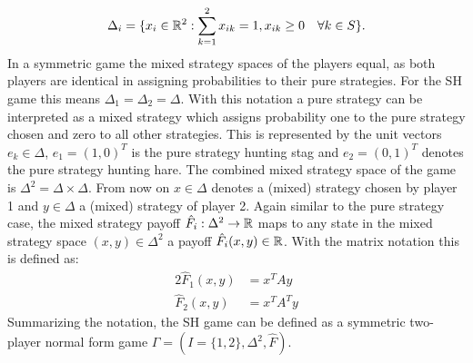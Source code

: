 \begin{align*}
        \Delta_i = \{ x_i \in \mathbb{R}^2 : \sum_{k=1}^2 x_{ik} = 1, x_{ik} \geq 0 \quad
\forall k \in S\}.
\end{align*}
In a symmetric game the mixed strategy spaces of the players
equal, as both players are identical in assigning probabilities to their
pure strategies. For the SH game this means $\Delta_1 = \Delta_2 = \Delta$.
With this notation a pure strategy can be interpreted as a mixed strategy
which assigns probability one to the pure strategy chosen and zero to all
other strategies. This is represented by the unit vectors 
$e_k \in \Delta$, $e_1 = (1,0)^T$ is the pure strategy hunting stag 
and $e_2 =(0,1)^T$ denotes the pure strategy hunting hare.
The combined mixed strategy space of the game is $\Delta^2 = \Delta \times
\Delta$.
From now on $x \in \Delta$ denotes a (mixed) strategy
chosen by player 1 and $y \in \Delta$ a (mixed) strategy of player 2.
Again similar to the pure strategy case, the mixed strategy payoff 
$\hat{F}_i:\Delta^2 \rightarrow \mathbb{R}$ maps to any state in the mixed strategy
space  $(x,y) \in \Delta^2$ a payoff $\hat{F}_i(x,y) \in \mathbb{R}$.
With the matrix notation this is defined as: 
\begin{alignat*}{2}
        \hat{F}_1(x,y) &= x^T A y \\
        \hat{F}_2(x,y) &= x^T A^T y 
\end{alignat*}
Summarizing the notation, the SH game can be defined as a symmetric two-player
normal form game $\Gamma = (I=\{1,2\}, \Delta^2, \hat{F})$.

